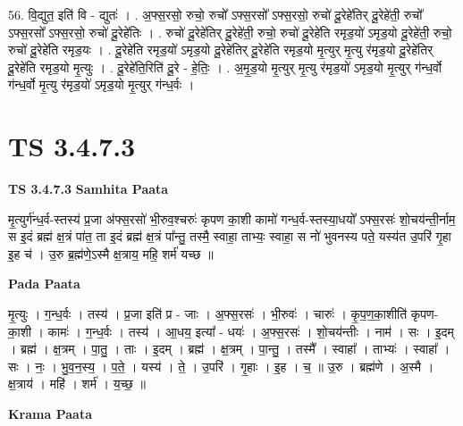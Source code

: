 \documentclass[17pt]{extarticle}
\begin{document}
56. वि॒द्युत॒ इति॑ वि - द्युतः॑ । . अ॒फ्स॒रसो॒ रुचो॒ रुचो᳚ ऽफ्स॒रसो᳚ ऽफ्स॒रसो॒ रुचो॑ दू॒रेहे॑तिर् दू॒रेहे॑ती॒ रुचो᳚ ऽफ्स॒रसो᳚ ऽफ्स॒रसो॒ रुचो॑ दू॒रेहे॑तिः । . रुचो॑ दू॒रेहे॑तिर् दू॒रेहे॑ती॒ रुचो॒ रुचो॑ दू॒रेहे॑ति रमृड॒यो॑ ऽमृड॒यो दू॒रेहे॑ती॒ रुचो॒ रुचो॑ दू॒रेहे॑ति रमृड॒यः । . दू॒रेहे॑ति रमृड॒यो॑ ऽमृड॒यो दू॒रेहे॑तिर् दू॒रेहे॑ति रमृड॒यो मृ॒त्युर् मृ॒त्यु र॑मृड॒यो दू॒रेहे॑तिर् दू॒रेहे॑ति रमृड॒यो मृ॒त्युः । . दू॒रेहे॑ति॒रिति॑ दू॒रे - हे॒तिः॒ । . अ॒मृ॒ड॒यो मृ॒त्युर् मृ॒त्यु र॑मृड॒यो॑ ऽमृड॒यो मृ॒त्युर् ग॑न्ध॒र्वो ग॑न्ध॒र्वो मृ॒त्यु र॑मृड॒यो॑ 
ऽमृड॒यो मृ॒त्युर् ग॑न्ध॒र्वः । \newline
\pagebreak
{}

\section{ TS 3.4.7.3 }

\textbf{TS 3.4.7.3 } \newline
\textbf{Samhita Paata} \newline

मृ॒त्युर्ग॑न्ध॒र्व-स्तस्य॑ प्र॒जा अ॑फ्स॒रसो॑ भी॒रुव॒श्चरुः॑ कृपण का॒शी कामो॑ गन्ध॒र्व-स्तस्या॒धयो᳚ ऽफ्स॒रसः॑ शो॒चय॑न्ती॒र्नाम॒ स इ॒दं ब्रह्म॑ क्ष॒त्रं पा॑त॒ ता इ॒दं ब्रह्म॑ क्ष॒त्रं पा᳚न्तु॒ तस्मै॒ स्वाहा॒ ताभ्यः॒ स्वाहा॒ स नो॑ भुवनस्य पते॒ यस्य॑त उ॒परि॑ गृ॒हा इ॒ह च॑ । उ॒रु ब्र॒ह्म॑णे॒ऽस्मै क्ष॒त्राय॒ महि॒ शर्म॑ यच्छ ॥ \newline

\textbf{Pada Paata} \newline

मृ॒त्युः । ग॒न्ध॒र्वः । तस्य॑ । प्र॒जा इति॑ प्र - जाः । अ॒फ्स॒रसः॑ । भी॒रुवः॑ । चारुः॑ । कृ॒प॒ण॒का॒शीति॑ कृपण-का॒शी । कामः॑ । ग॒न्ध॒र्वः । तस्य॑ । आ॒धय॒ इत्या᳚ - धयः॑ । अ॒फ्स॒रसः॑ । शो॒चय॑न्तीः । नाम॑ । सः । इ॒दम् । ब्रह्म॑ । क्ष॒त्रम् । पा॒तु॒ । ताः । इ॒दम् । ब्रह्म॑ । क्ष॒त्रम् । पा॒न्तु॒ । तस्मै᳚ । स्वाहा᳚ । ताभ्यः॑ । स्वाहा᳚ । सः । नः॒ । भु॒व॒न॒स्य॒ । प॒ते॒ । यस्य॑ । ते॒ । उ॒परि॑ । गृ॒हाः । इ॒ह । च॒ ॥ उ॒रु । ब्रह्म॑णे । अ॒स्मै । क्ष॒त्राय॑ । महि॑ । शर्म॑ । य॒च्छ॒ ॥  \newline


\textbf{Krama Paata} \newline
\end{document}

